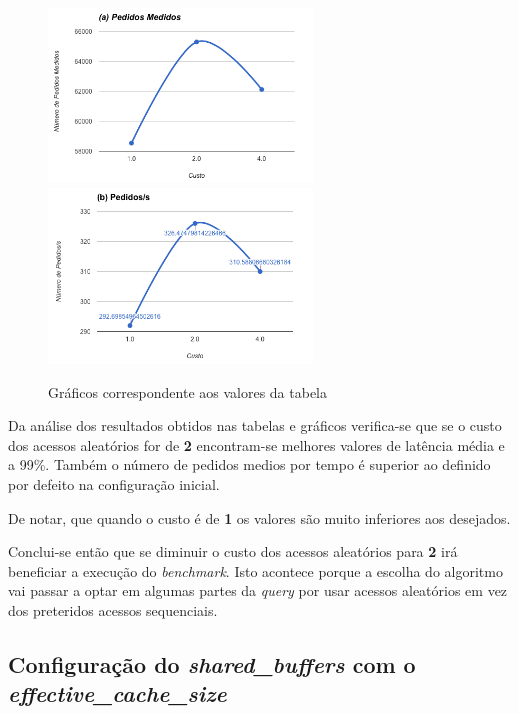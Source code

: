 \begin{figure}[ht!]
\centering
\includegraphics[width=70mm]{img/07_rpc_a.png}
\includegraphics[width=70mm]{img/07_rpc_b.png}
\caption{Gráficos correspondente aos valores da tabela \label{overflow}}
\end{figure}

Da análise dos resultados obtidos nas tabelas e gráficos verifica-se que se o custo dos acessos aleatórios for de \textbf{2} encontram-se melhores valores de latência média e a 99\%. Também o número de pedidos medios por tempo é superior ao definido por defeito na configuração inicial.

De notar, que quando o custo é de \textbf{1} os valores são muito inferiores aos desejados.

Conclui-se então que se diminuir o custo dos acessos aleatórios para \textbf{2} irá beneficiar a execução do \textit{benchmark}. Isto acontece porque a escolha do algoritmo vai passar a optar em algumas partes da \textit{query} por usar acessos aleatórios em vez dos preteridos acessos sequenciais.

\newpage

\subsection{Configuração do \textit{shared\_buffers} com o \textit{effective\_cache\_size}}
